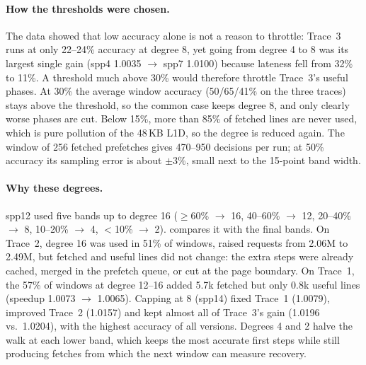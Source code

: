 \documentclass[11pt,a4paper]{article}
\theoremstyle{themethm}
\theoremstyle{themedef}
\theoremstyle{themeex}
\theoremstyle{themerem}
\begin{document}
\paragraph{How the thresholds were chosen.} The data showed that low accuracy
alone is not a reason to throttle: Trace~3 runs at only 22--24\% accuracy at
degree 8, yet going from degree 4 to 8 was its largest single gain (spp4
1.0035 $\to$ spp7 1.0100) because lateness fell from 32\% to 11\%. A threshold
much above 30\% would therefore throttle Trace~3's useful phases. At 30\% the
average window accuracy (50/65/41\% on the three traces) stays above the
threshold, so the common case keeps degree 8, and only clearly worse phases are
cut. Below 15\%, more than 85\% of fetched lines are never used, which is pure
pollution of the 48\,KB L1D, so the degree is reduced again. The window of 256
fetched prefetches gives 470--950 decisions per run; at 50\% accuracy its
sampling error is about $\pm3\%$, small next to the 15-point band width.

\paragraph{Why these degrees.} spp12 used five bands up to degree 16
($\ge$60\% $\to$ 16, 40--60\% $\to$ 12, 20--40\% $\to$ 8, 10--20\% $\to$ 4,
$<$10\% $\to$ 2).  compares it with the final bands. On
Trace~2, degree 16 was used in 51\% of windows, raised requests from 2.06M to
2.49M, but fetched and useful lines did not change: the extra steps were
already cached, merged in the prefetch queue, or cut at the page boundary. On
Trace~1, the 57\% of windows at degree 12--16 added 5.7k fetched but only
0.8k useful lines (speedup 1.0073 $\to$ 1.0065). Capping at 8 (spp14) fixed
Trace~1 (1.0079), improved Trace~2 (1.0157) and kept almost all of Trace~3's
gain (1.0196 vs.\ 1.0204), with the highest accuracy of all versions. Degrees
4 and 2 halve the walk at each lower band, which keeps the most accurate first
steps while still producing fetches from which the next window can measure
recovery.
\end{document}

